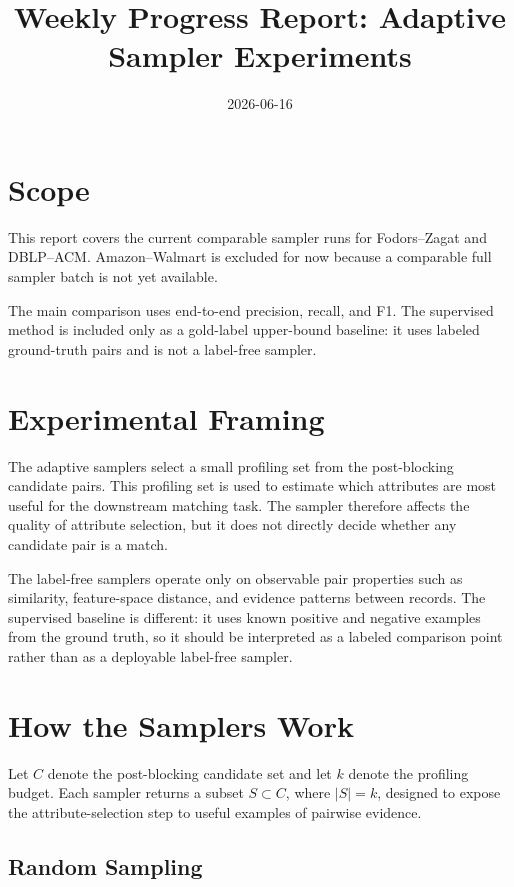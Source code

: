 \documentclass[11pt]{article}
\title{Weekly Progress Report: Adaptive Sampler Experiments}
\author{}
\date{2026-06-16}
\begin{document}
\maketitle

\section{Scope}

This report covers the current comparable sampler runs for Fodors--Zagat and DBLP--ACM. Amazon--Walmart is excluded for now because a comparable full sampler batch is not yet available.

The main comparison uses end-to-end precision, recall, and F1. The supervised method is included only as a gold-label upper-bound baseline: it uses labeled ground-truth pairs and is not a label-free sampler.

\section{Experimental Framing}

The adaptive samplers select a small profiling set from the post-blocking candidate pairs. This profiling set is used to estimate which attributes are most useful for the downstream matching task. The sampler therefore affects the quality of attribute selection, but it does not directly decide whether any candidate pair is a match.

The label-free samplers operate only on observable pair properties such as similarity, feature-space distance, and evidence patterns between records. The supervised baseline is different: it uses known positive and negative examples from the ground truth, so it should be interpreted as a labeled comparison point rather than as a deployable label-free sampler.

\section{How the Samplers Work}

Let \(C\) denote the post-blocking candidate set and let \(k\) denote the profiling budget. Each sampler returns a subset \(S \subset C\), where \(|S| = k\), designed to expose the attribute-selection step to useful examples of pairwise evidence.

\subsection{Random Sampling}
\end{document}
